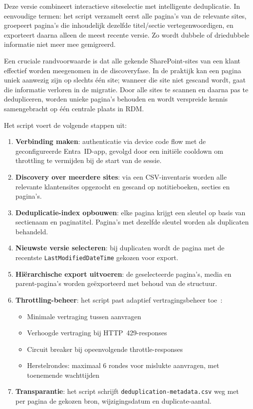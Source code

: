 Deze versie combineert interactieve siteselectie met intelligente deduplicatie. In eenvoudige termen: het script verzamelt eerst alle pagina's van de relevante sites, groepeert pagina's die inhoudelijk dezelfde titel/sectie vertegenwoordigen, en exporteert daarna alleen de meest recente versie. Zo wordt dubbele of driedubbele informatie niet meer mee gemigreerd.

Een cruciale randvoorwaarde is dat alle gekende SharePoint-sites van een klant effectief worden meegenomen in de discoveryfase. In de praktijk kan een pagina uniek aanwezig zijn op slechts één site; wanneer die site niet gescand wordt, gaat die informatie verloren in de migratie. Door alle sites te scannen en daarna pas te dedupliceren, worden unieke pagina's behouden en wordt verspreide kennis samengebracht op één centrale plaats in RDM.

Het script voert de volgende stappen uit:

\begin{enumerate}
    \item \textbf{Verbinding maken}: authenticatie via device code flow met de geconfigureerde Entra~ID-app, gevolgd door een initiële cooldown om throttling te vermijden bij de start van de sessie.
    \item \textbf{Discovery over meerdere sites}: via een CSV-inventaris worden alle relevante klantensites opgezocht en gescand op notitieboeken, secties en pagina's.
    \item \textbf{Deduplicatie-index opbouwen}: elke pagina krijgt een sleutel op basis van sectienaam en paginatitel. Pagina's met dezelfde sleutel worden als duplicaten behandeld.
    \item \textbf{Nieuwste versie selecteren}: bij duplicaten wordt de pagina met de recentste \texttt{LastModifiedDateTime} gekozen voor export.
    \item \textbf{Hiërarchische export uitvoeren}: de geselecteerde pagina's, media en parent-pagina's worden geëxporteerd met behoud van de structuur.
    \item \textbf{Throttling-beheer}: het script past adaptief vertragingsbeheer toe~\autocite{microsoft2025throttling}:
    \begin{itemize}
        \item Minimale vertraging tussen aanvragen
        \item Verhoogde vertraging bij HTTP~429-responses
        \item Circuit breaker bij opeenvolgende throttle-responses
        \item Herstelrondes: maximaal 6 rondes voor mislukte aanvragen, met toenemende wachttijden
    \end{itemize}
    \item \textbf{Transparantie}: het script schrijft \texttt{deduplication-metadata.csv} weg met per pagina de gekozen bron, wijzigingsdatum en duplicate-aantal.
\end{enumerate}

